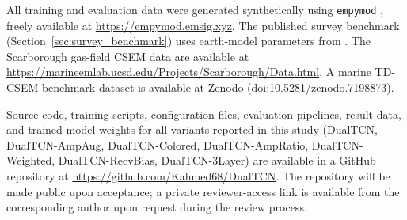 \documentclass[journal]{IEEEtran}
\begin{document}
All training and evaluation data were generated synthetically using
\texttt{empymod} \citep{werthmullerEmpymod}, freely available at
\url{https://empymod.emsig.xyz}.  The published survey benchmark
(Section~\ref{sec:survey_benchmark}) uses earth-model parameters
from \citet{constable2006, key2009, constable2010ten, key2012marine}.
The Scarborough gas-field CSEM data are available at
\url{https://marineemlab.ucsd.edu/Projects/Scarborough/Data.html}.
A marine TD-CSEM benchmark dataset is available at Zenodo
(doi:10.5281/zenodo.7198873).

Source code, training scripts, configuration files, evaluation
pipelines, result data, and trained model weights for all variants
reported in this study (DualTCN, DualTCN-AmpAug, DualTCN-Colored,
DualTCN-AmpRatio, DualTCN-Weighted, DualTCN-RecvBias,
DualTCN-3Layer) are available in a GitHub repository at
\url{https://github.com/Kahmed68/DualTCN}.  The repository will be
made public upon acceptance; a private reviewer-access link is
available from the corresponding author upon request during the
review process.


\end{document}
